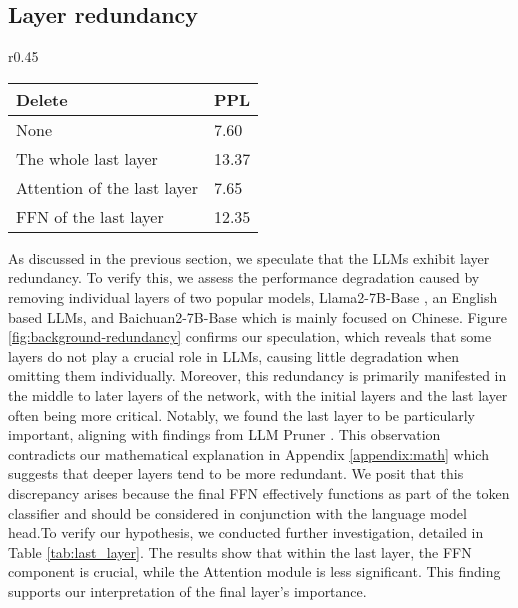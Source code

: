 		
		
		
		
		\subsection{Layer redundancy}\label{layerredundancy}
		\begin{wraptable}{r}{0.45\textwidth}\label{tab:last layer}
				\centering
				\caption{Ablation of removing FFN and Attention of Llama2-7B-Base. We sample 100 instances from PG19 \citep{rae2019compressive} to calculate PPL.}
				\label{tab:last_layer}
				\begin{tabular}{@{}ll@{}}
					\toprule
					\textbf{Delete} & \textbf{PPL} \\ \midrule
					None & 7.60\\
					The whole last layer & 13.37 \\
					Attention of the last layer & 7.65 \\
					FFN of the last layer & 12.35 \\ \bottomrule
				\end{tabular}
		\end{wraptable}
		As discussed in the previous section, we speculate that the LLMs exhibit layer redundancy. To verify this, we assess the performance degradation caused by removing individual layers of two popular models, Llama2-7B-Base \citep{touvron2023llama}, an English based LLMs, and Baichuan2-7B-Base \citep{yang2023baichuan} which is mainly focused on Chinese. Figure \ref{fig:background-redundancy} confirms our speculation, which reveals that some layers do not play a crucial role in LLMs, causing little degradation when omitting them individually. Moreover, this redundancy is primarily manifested in the middle to later layers of the network, with the initial layers and the last layer often being more critical. Notably, we found the last layer to be particularly important, aligning with findings from LLM Pruner \citep{ma2024llm}. This observation contradicts our mathematical explanation in Appendix \ref{appendix:math} which suggests that deeper layers tend to be more redundant. We posit that this discrepancy arises because the final FFN effectively functions as part of the token classifier and should be considered in conjunction with the language model head.To verify our hypothesis, we conducted further investigation, detailed in Table \ref{tab:last_layer}. The results show that within the last layer, the FFN component is crucial, while the Attention module is less significant. This finding supports our interpretation of the final layer's importance.
		
